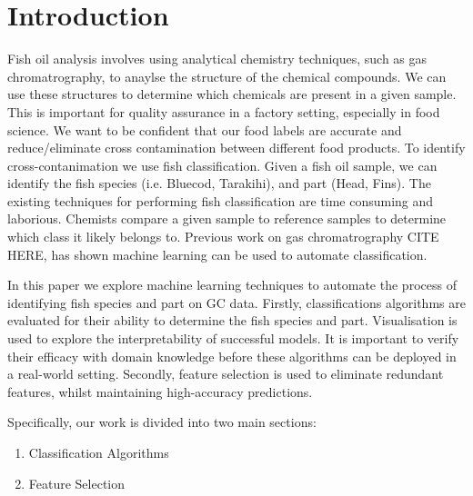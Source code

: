\documentclass[runningheads]{llncs}
\begin{document}
\section{Introduction}


Fish oil analysis involves using analytical chemistry techniques, such as gas chromatrography, to anaylse the structure of the chemical compounds.
We can use these structures to determine which chemicals are present in a given sample. 
This is important for quality assurance in a factory setting, especially in food science. 
We want to be confident that our food labels are accurate and reduce/eliminate cross contamination between different food products. 
To identify cross-contanimation we use fish classification. 
Given a fish oil sample, we can identify the fish species (i.e. Bluecod, Tarakihi), and part (Head, Fins).
The existing techniques for performing fish classification are time consuming and laborious. 
Chemists compare a given sample to reference samples to determine which class it likely belongs to. 
Previous work on gas chromatrography CITE HERE, has shown machine learning can be used to automate classification. 

In this paper we explore machine learning techniques to automate the process of identifying fish species and part on GC data. 
Firstly, classifications algorithms are evaluated for their ability to determine the fish species and part. 
Visualisation is used to explore the interpretability of successful models.
It is important to verify their efficacy with domain knowledge before these algorithms can be deployed in a real-world setting.
Secondly, feature selection is used to eliminate redundant features, whilst maintaining high-accuracy predictions. 

Specifically, our work is divided into two main sections: 
\begin{enumerate}
    \item Classification Algorithms 
    \item Feature Selection
\end{enumerate}
\end{document}
